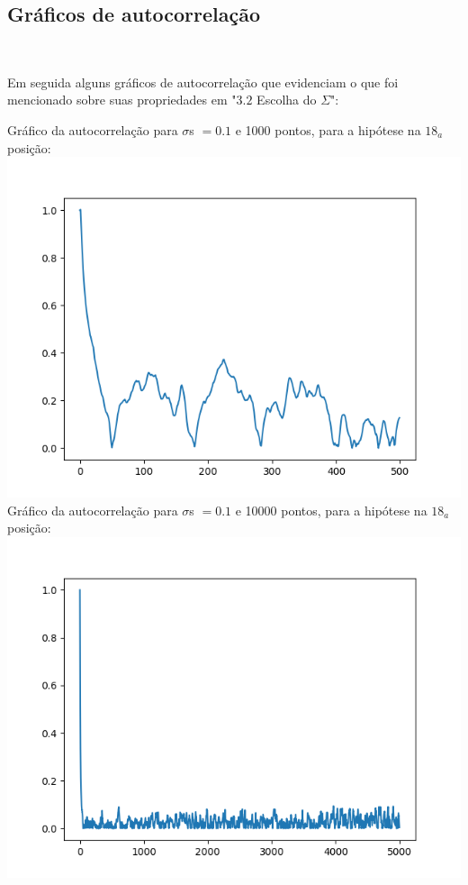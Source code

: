 \documentclass[pt12]{article}
\begin{document}
\subsection{Gráficos de autocorrelação}
\ 

Em seguida alguns gráficos de autocorrelação que evidenciam o que foi mencionado sobre suas propriedades em "$3.2$ Escolha do $\Sigma$":
\newpage

\begin{center}
Gráfico da autocorrelação para $\sigma$s $= 0.1$ e 1000 pontos, para a hipótese na $18_a$ posição:\\
\includegraphics[scale=0.5]{Autocorr1000hip18.png}\\
Gráfico da autocorrelação para $\sigma$s $= 0.1$ e 10000 pontos, para a hipótese na $18_a$ posição:\\
\includegraphics[scale=0.5]{Autocorr10000hip18.png}\\

\end{center}
\end{document}
